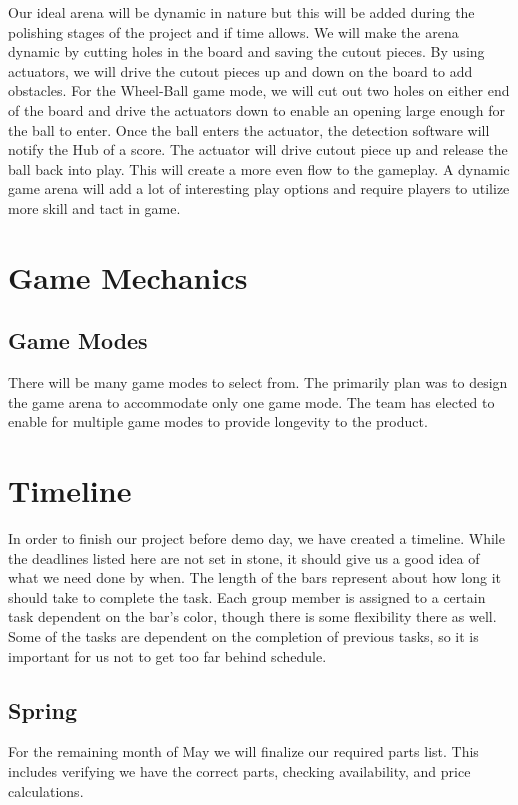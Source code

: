 \documentclass[11pt]{ieeeconf}
\begin{document}
Our ideal arena will be dynamic in nature but this will be added during the polishing stages of the project and if time allows. We will make the arena dynamic by cutting holes in the board and saving the cutout pieces. By using actuators, we will drive the cutout pieces up and down on the board to add obstacles. For the Wheel-Ball game mode, we will cut out two holes on either end of the board and drive the actuators down to enable an opening large enough for the ball to enter. Once the ball enters the actuator, the detection software will notify the Hub of a score. The actuator will drive cutout piece up and release the ball back into play. This will create a more even flow to the gameplay. A dynamic game arena will add a lot of interesting play options and require players to utilize more skill and tact in game.

\section{Game Mechanics}

\subsection{Game Modes}
There will be many game modes to select from. The primarily plan was to design the game arena to accommodate only one game mode. The team has elected to enable for multiple game modes to provide longevity to the product.    

\section{Timeline}
In order to finish our project before demo day, we have created a timeline. While the deadlines listed here are not set in stone, it should give us a good idea of what we need done by when. The length of the bars represent about how long it should take to complete the task. Each group member is assigned to a certain task dependent on the bar's color, though there is some flexibility there as well. Some of the tasks are dependent on the completion of previous tasks, so it is important for us not to get too far behind schedule. 

\subsection{Spring}
For the remaining month of May we will finalize our required parts list. This includes verifying we have the correct parts, checking availability, and price calculations.
\end{document}

